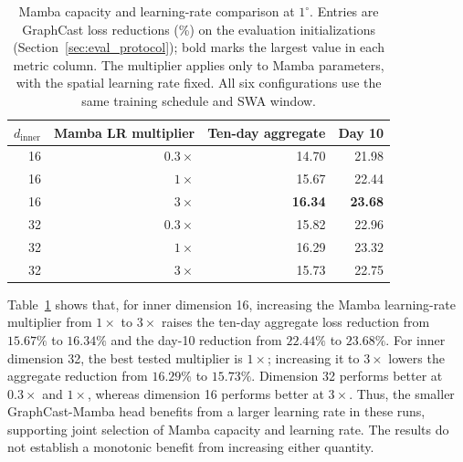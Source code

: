 \documentclass{article}
\begin{document}
\begin{table}[!htbp]
    \centering
    \caption{Mamba capacity and learning-rate comparison at $1^\circ$. Entries are {GraphCast loss} reductions (\%) on the evaluation initializations (Section~\ref{sec:eval_protocol}); bold marks the largest value in each metric column. The multiplier applies only to Mamba parameters, with the spatial learning rate fixed. All six configurations use the same training schedule and SWA window.}
    \label{tab:lr_sensitivity}
    \small
    \begin{tabular}{rrrr}
        \toprule
        $d_{\mathrm{inner}}$ & Mamba LR multiplier & Ten-day aggregate & Day 10 \\
        \midrule
        16 & $0.3\times$ & 14.70 & 21.98 \\
        16 & $1\times$   & 15.67 & 22.44 \\
        16 & $3\times$   & \textbf{16.34} & \textbf{23.68} \\
        32 & $0.3\times$ & 15.82 & 22.96 \\
        32 & $1\times$   & 16.29 & 23.32 \\
        32 & $3\times$   & 15.73 & 22.75 \\
        \bottomrule
    \end{tabular}
\end{table}

\begin{samepage}
Table~\ref{tab:lr_sensitivity} shows that, for inner dimension 16, increasing the Mamba learning-rate multiplier from $1\times$ to $3\times$ raises the ten-day aggregate loss reduction from $15.67\%$ to $16.34\%$ and the day-10 reduction from $22.44\%$ to $23.68\%$. For inner dimension 32, the best tested multiplier is $1\times$; increasing it to $3\times$ lowers the aggregate reduction from $16.29\%$ to $15.73\%$. Dimension 32 performs better at $0.3\times$ and $1\times$, whereas dimension 16 performs better at $3\times$. Thus, the smaller GraphCast-Mamba head benefits from a larger learning rate in these runs, supporting joint selection of Mamba capacity and learning rate. The results do not establish a monotonic benefit from increasing either quantity.\par
\end{samepage}
\end{document}
